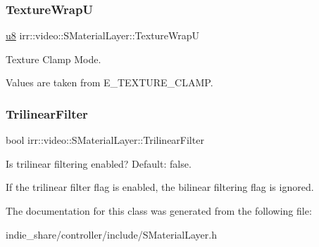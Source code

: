 \subsubsection{\texorpdfstring{Texture\+WrapU}{TextureWrapU}}
{\footnotesize\ttfamily \hyperlink{namespaceirr_a646874f69af8ff87fc10201b0254a761}{u8} irr\+::video\+::\+S\+Material\+Layer\+::\+Texture\+WrapU}



Texture Clamp Mode. 

Values are taken from E\+\_\+\+T\+E\+X\+T\+U\+R\+E\+\_\+\+C\+L\+A\+MP. \mbox{\label{classirr_1_1video_1_1SMaterialLayer_ad1b093b1a8e26cb10156a02ac78bdf67}} 
\subsubsection{\texorpdfstring{Trilinear\+Filter}{TrilinearFilter}}
{\footnotesize\ttfamily bool irr\+::video\+::\+S\+Material\+Layer\+::\+Trilinear\+Filter}



Is trilinear filtering enabled? Default\+: false. 

If the trilinear filter flag is enabled, the bilinear filtering flag is ignored. 

The documentation for this class was generated from the following file\+:\begin{DoxyCompactItemize}
\item 
indie\+\_\+share/controller/include/S\+Material\+Layer.\+h\end{DoxyCompactItemize}
